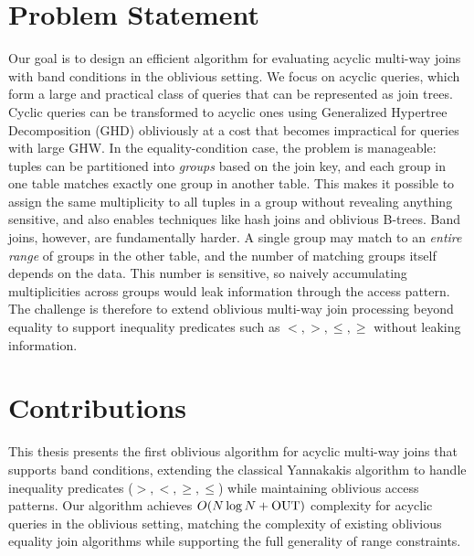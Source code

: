 \section{Problem Statement}

Our goal is to design an efficient algorithm for evaluating acyclic multi-way joins with band conditions in the oblivious setting. We focus on acyclic queries, which form a large and practical class of queries that can be represented as join trees. Cyclic queries can be transformed to acyclic ones using Generalized Hypertree Decomposition (GHD) obliviously at a cost that becomes impractical for queries with large GHW. In the equality-condition case, the problem is manageable: tuples can be partitioned into \emph{groups} based on the join key, and each group in one table matches exactly one group in another table. This makes it possible to assign the same multiplicity to all tuples in a group without revealing anything sensitive, and also enables techniques like hash joins and oblivious B-trees. Band joins, however, are fundamentally harder. A single group may match to an \emph{entire range} of groups in the other table, and the number of matching groups itself depends on the data. This number is sensitive, so naively accumulating multiplicities across groups would leak information through the access pattern. The challenge is therefore to extend oblivious multi-way join processing beyond equality to support inequality predicates such as $<, >, \leq, \geq$ without leaking information.

\section{Contributions}

This thesis presents the first oblivious algorithm for acyclic multi-way joins that supports band conditions, extending the classical Yannakakis algorithm to handle inequality predicates ($>, <, \geq, \leq$) while maintaining oblivious access patterns. Our algorithm achieves $O(N \log N + \text{OUT})$ complexity for acyclic queries in the oblivious setting, matching the complexity of existing oblivious equality join algorithms while supporting the full generality of range constraints.

